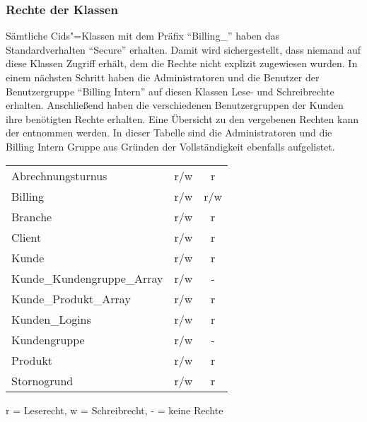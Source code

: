 \subsubsection{Rechte der Klassen}
Sämtliche Cids"=Klassen mit dem Präfix "`Billing\_"' haben das Standardverhalten "`Secure"' erhalten. Damit wird sichergestellt, dass niemand auf diese Klassen Zugriff erhält, dem die Rechte nicht explizit zugewiesen wurden.
In einem nächsten Schritt haben die Administratoren und die Benutzer der Benutzergruppe "`Billing Intern"' auf diesen Klassen Lese- und Schreibrechte erhalten.
Anschließend haben die verschiedenen Benutzergruppen der Kunden ihre benötigten Rechte erhalten.
Eine Übersicht zu den vergebenen Rechten kann der  entnommen werden.
In dieser Tabelle sind die Administratoren und die Billing Intern Gruppe aus Gründen der Vollständigkeit ebenfalls aufgelistet.

\begin{minipage}{\linewidth}
\centering
{} \label{tab:klassenrechte}
\begin{tabulary}{\textwidth}{|l|C|c|}
 \hline
  &  &  \tabularnewline
 \hline
 Abrechnungsturnus
  & r/w & r \\ 
 \hline 
 Billing & r/w & r/w \\ 
 \hline 
 Branche & r/w & r \\ 
 \hline 
 Client & r/w & r \\ 
 \hline 
 Kunde & r/w & r \\ 
 \hline 
 Kunde\_Kundengruppe\_Array & r/w & - \\ 
 \hline 
 Kunde\_Produkt\_Array & r/w & r \\ 
 \hline 
 Kunden\_Logins & r/w & r \\ 
 \hline 
 Kundengruppe & r/w & - \\ 
 \hline 
 Produkt & r/w & r \\ 
 \hline 
 Stornogrund & r/w & r \\ 
 \hline 
 \end{tabulary}
 \par
 \bigskip
 r = Leserecht, w = Schreibrecht, - = keine Rechte
 \end{minipage}
 
